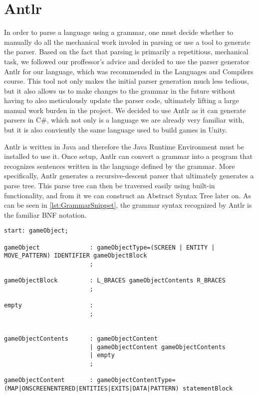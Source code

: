 \section{Antlr}
In order to parse a language using a grammar, one must decide whether to manually do all the mechanical work involed in parsing or use a tool to generate the parser.
Based on the fact that parsing is primarily a repetitious, mechanical task, we followed our proffessor's advice and decided to use the parser generator Antlr for our language, which was recommended in the Languages and Compilers course. 
This tool not only makes the initial parser generation much less tedious, but it also allows us to make changes to the grammar in the future without having to also meticulously update the parser code, ultimately lifting a large manual work burden in the project.
We decided to use Antlr as it can generate parsers in C\#, which not only is a language we are already very familiar with, but it is also conviently the same language used to build games in Unity. 


Antlr is written in Java and therefore the Java Runtime Environment must be installed to use it. 
Once setup, Antlr can convert a grammar into a program that recognizes sentences written in the language defined by the grammar.
More specifically, Antlr generates a recursive-descent parser that ultimately generates a parse tree.
This parse tree can then be traversed easily using built-in functionality, and from it we can construct an Abstract Syntax Tree later on.
As can be seen in \ref{lst:GrammarSnippet}, the grammar syntax recognized by Antlr is the familiar BNF notation.


\begin{lstlisting}[caption={A snippet of the \dazel{} grammar used by Antlr to generate the parser}, label={lst:GrammarSnippet}]
start: gameObject;

gameObject              : gameObjectType=(SCREEN | ENTITY | MOVE_PATTERN) IDENTIFIER gameObjectBlock
						;
						
gameObjectBlock         : L_BRACES gameObjectContents R_BRACES
						;

empty                   : 
						;


gameObjectContents      : gameObjectContent
						| gameObjectContent gameObjectContents
						| empty
						;

gameObjectContent       : gameObjectContentType=(MAP|ONSCREENENTERED|ENTITIES|EXITS|DATA|PATTERN) statementBlock 
\end{lstlisting}


